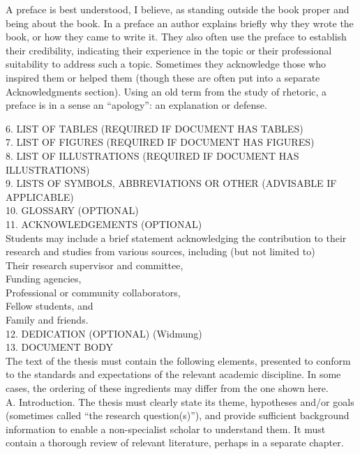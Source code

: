   A preface is best understood, I believe, as standing outside the book proper and being about the 
    book. In a preface an author explains briefly why they wrote the book, or how they came to write 
    it. They also often use the preface to establish their credibility, indicating their experience 
    in the topic or their professional suitability to address such a topic. Sometimes they 
    acknowledge those who inspired them or helped them (though these are often put into a separate 
    Acknowledgments section). Using an old term from the study of rhetoric, a preface is in a sense 
    an “apology”: an explanation or defense.

\tableofcontents
\clearpage

6. LIST OF TABLES (REQUIRED IF DOCUMENT HAS TABLES) \\
7. LIST OF FIGURES (REQUIRED IF DOCUMENT HAS FIGURES) \\
8. LIST OF ILLUSTRATIONS (REQUIRED IF DOCUMENT HAS ILLUSTRATIONS) \\
9. LISTS OF SYMBOLS, ABBREVIATIONS OR OTHER (ADVISABLE IF APPLICABLE) \\
10. GLOSSARY (OPTIONAL) \\
11. ACKNOWLEDGEMENTS (OPTIONAL) \\
  Students may include a brief statement acknowledging the contribution to their research and 
    studies from various sources, including (but not limited  to) \\

  Their research supervisor and committee, \\
  Funding agencies, \\
  Professional or community collaborators, \\
  Fellow students, and \\
  Family and friends. \\

12. DEDICATION (OPTIONAL) (Widmung) \\

13. DOCUMENT BODY \\
  The text of the thesis must contain the following elements, presented to conform to the standards 
    and expectations of the relevant academic discipline. In some cases, the ordering of these 
    ingredients may differ from the one shown here. \\

  A. Introduction. The thesis must clearly state its theme, hypotheses and/or goals (sometimes 
    called “the research question(s)”), and provide sufficient background information to enable a 
    non-specialist scholar to understand them. It must contain a thorough review of relevant 
    literature, perhaps in a separate chapter. \\

